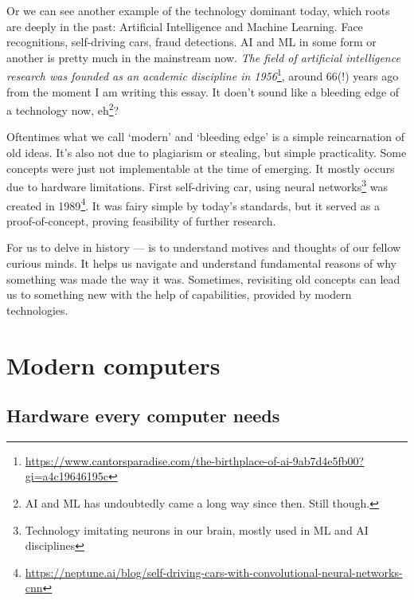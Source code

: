 \documentclass{report}
\begin{document}
            Or we can see another example of the technology dominant today, which roots are deeply in the past: Artificial Intelligence and Machine Learning. Face recognitions, self-driving cars, fraud detections.
            AI and ML in some form or another is pretty much in the mainstream now. \emph{The field of artificial intelligence research was founded as an academic discipline in 1956}\footnote{
            \href{https://www.cantorsparadise.com/the-birthplace-of-ai-9ab7d4e5fb00?gi=a4c19646195c}{https://www.cantorsparadise.com/the-birthplace-of-ai-9ab7d4e5fb00?gi=a4c19646195c}}, around 66(!) years ago 
            from the moment I am writing this essay. It doen't sound like a bleeding edge of a technology now, eh\footnote{AI and ML has undoubtedly came a long way since then. Still though.}? \par

            Oftentimes what we call `modern' and `bleeding edge' is a simple reincarnation of old ideas. It's also not due to plagiarism or stealing, but simple practicality.
            Some concepts were just not implementable at the time of emerging. It mostly occurs due to hardware limitations. First self-driving car, using neural 
            networks\footnote{Technology imitating neurons in our brain, mostly used in ML and AI disciplines} was created in 1989\footnote{\href{https://neptune.ai/blog/self-driving-cars-with-convolutional-neural-networks-cnn}
            {https://neptune.ai/blog/self-driving-cars-with-convolutional-neural-networks-cnn}}. It was fairy simple by today's standards, but it served as a proof-of-concept,
            proving feasibility of further research. \par

            For us to delve in history --- is to understand motives and thoughts of our fellow curious minds. It helps us navigate and understand fundamental reasons of why
            something was made the way it was. Sometimes, revisiting old concepts can lead us to something new with the help of capabilities, provided by modern technologies.

            \newpage
        \section{Modern computers}
            \subsection{Hardware every computer needs}
\end{document}
